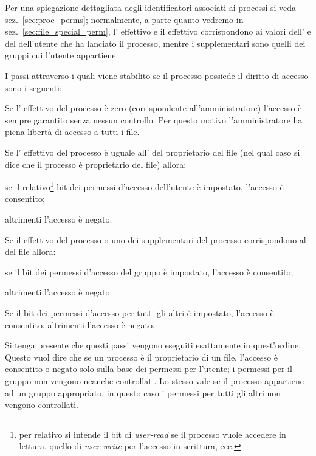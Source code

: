 Per una spiegazione dettagliata degli identificatori associati ai processi si
veda sez.~\ref{sec:proc_perms}; normalmente, a parte quanto vedremo in
sez.~\ref{sec:file_special_perm}, l' effettivo e il  effettivo
corrispondono ai valori dell' e del  dell'utente che ha
lanciato il processo, mentre i  supplementari sono quelli dei gruppi
cui l'utente appartiene.

I passi attraverso i quali viene stabilito se il processo possiede il diritto
di accesso sono i seguenti:
\begin{enumerate*}
\item Se l' effettivo del processo è zero (corrispondente
  all'amministratore) l'accesso è sempre garantito senza nessun controllo. Per
  questo motivo l'amministratore ha piena libertà di accesso a tutti i file.
\item Se l' effettivo del processo è uguale all' del
  proprietario del file (nel qual caso si dice che il processo è proprietario
  del file) allora:
  \begin{itemize*}
  \item se il relativo\footnote{per relativo si intende il bit di
      \textit{user-read} se il processo vuole accedere in lettura, quello di
      \textit{user-write} per l'accesso in scrittura, ecc.} bit dei permessi
    d'accesso dell'utente è impostato, l'accesso è consentito;
  \item altrimenti l'accesso è negato.
  \end{itemize*}
\item Se il  effettivo del processo o uno dei  supplementari
  del processo corrispondono al  del file allora:
  \begin{itemize*}
  \item se il bit dei permessi d'accesso del gruppo è impostato, l'accesso è
    consentito;
  \item altrimenti l'accesso è negato.
  \end{itemize*}
\item Se il bit dei permessi d'accesso per tutti gli altri è impostato,
  l'accesso è consentito, altrimenti l'accesso è negato.
\end{enumerate*}

Si tenga presente che questi passi vengono eseguiti esattamente in
quest'ordine. Questo vuol dire che se un processo è il proprietario di un
file, l'accesso è consentito o negato solo sulla base dei permessi per
l'utente; i permessi per il gruppo non vengono neanche controllati. Lo stesso
vale se il processo appartiene ad un gruppo appropriato, in questo caso i
permessi per tutti gli altri non vengono controllati. 


